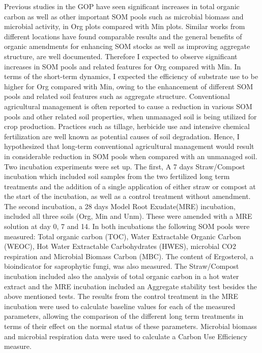 \documentclass[12pt]{report}
\begin{document}
	    Previous studies in the GOP have seen significant increases in total organic carbon as well as other important SOM pools such as microbial biomass and microbial activity, in Org plots compared with Min plots. Similar works from different locations have found comparable results and the general benefits of organic amendments for enhancing SOM stocks as well as improving aggregate  structure, are well documented. Therefore I expected to observe significant increases in SOM pools and related features for Org compared with Min. In terms of the short-term dynamics, I expected the efficiency of substrate use to be higher for Org compared with Min, owing to the enhancement of different SOM pools and related soil features such as aggregate structure. 
	    Conventional agricultural management is often reported to cause a reduction in various SOM pools and other related soil properties, when unmanaged soil is being utilized for crop production. Practices such as tillage, herbicide use and intensive chemical fertilization are well known as potential causes of soil degradation. Hence, I hypothesized that long-term conventional agricultural management would result in considerable reduction in SOM pools when compared with an unmanaged soil.\\
	    Two incubation experiments were set up. The first, A 7 days Straw/Compost incubation which included soil samples from the two fertilized long term treatments and the addition of a single application of either straw or compost at the start of the incubation, as well as a control treatment without amendment. The second incubation, a 28 days Model Root Exudate(MRE) incubation, included all three soils (Org, Min and Unm). These were amended with a MRE solution at day 0, 7 and 14. In both incubations the following SOM pools were measured: Total organic carbon (TOC), Water Extractable Organic Carbon (WEOC), Hot Water Extractable Carbohydrates (HWES), microbial CO2 respiration and Microbial Biomass Carbon (MBC). The content of Ergosterol, a bioindicator for saprophytic fungi, was also measured. The Straw/Compost incubation included also the analysis of total organic carbon in a hot water extract and the MRE incubation included an Aggregate stability test besides the above mentioned tests.  The results from the control treatment in the MRE incubation were used to calculate baseline values for each of the measured parameters, allowing the comparison of the different long term treatments in terms of their effect on the normal status of these parameters. Microbial biomass and microbial respiration data were used to calculate a Carbon Use Efficiency measure.\\
\end{document}
